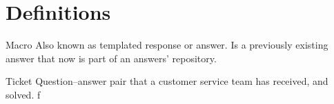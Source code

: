 \documentclass{sig-alternate-05-2015}
\begin{document}
% 
% 
% 
% 
% 

\section{Definitions}
\label{sec:def}

\begin{description}
\item{Macro} Also known as templated response or answer. Is a previously 
existing answer that now is part of an answers' repository.
\item{Ticket} Question--answer pair that a customer service team has received, 
and solved. f 
\end{description}


\end{document}
